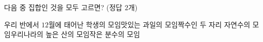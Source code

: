 다음 중 집합인 것을 모두 고르면? (정답 $2$개)
\begin{choicesv}{우리 반에서 $12$월에 태어난 학생의 모임}{맛있는 과일의 모임}{짝수인 두 자리 자연수의 모임}{우리나라의 높은 산의 모임}{작은 분수의 모임}\end{choicesv}
